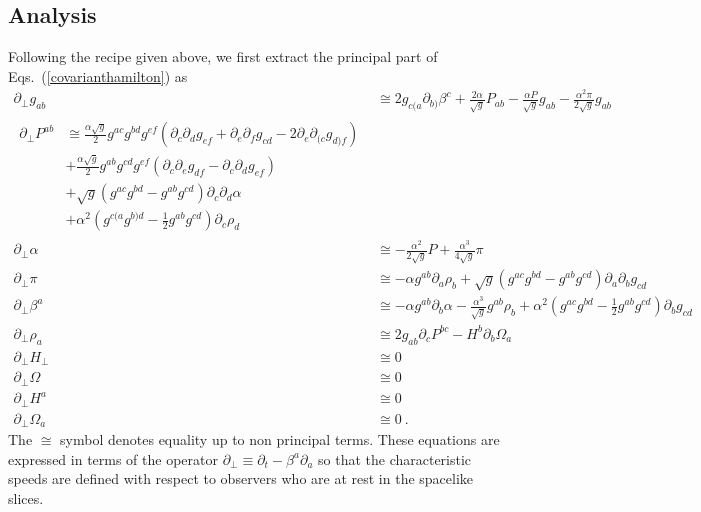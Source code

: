 \subsection{Analysis}\label{wellposednessanalysis}
Following the recipe given above, we first extract the principal part of Eqs.~(\ref{covarianthamilton}) as
\begin{subequations}\label{principalhamilton}
\begin{align}
\partial_{\perp}g_{ab} &\cong 2g_{c(a}\partial_{b)}\beta^{c} + \frac{2\alpha}{\sqrt{g}}P_{ab} - \frac{\alpha P}{\sqrt{g}}g_{ab} - \frac{\alpha^{2}\pi}{2\sqrt{g}}g_{ab}\\
\begin{split}
\partial_{\perp}P^{ab} &\cong \frac{\alpha\sqrt{g}}{2}g^{ac}g^{bd}g^{ef}\left(\partial_{c}\partial_{d}g_{ef} + \partial_{e}\partial_{f}g_{cd} - 2\partial_{e}\partial_{(c}g_{d)f}\right)\\
& + \frac{\alpha\sqrt{g}}{2}g^{ab}g^{cd}g^{ef}\left(\partial_{c}\partial_{e}g_{df} - \partial_{c}\partial_{d}g_{ef}\right)\\
& + \sqrt{g}\left(g^{ac}g^{bd} - g^{ab}g^{cd}\right)\partial_{c}\partial_{d}\alpha\\
& + \alpha^{2}\left(g^{c(a}g^{b)d} - \frac{1}{2}g^{ab}g^{cd}\right)\partial_{c}\rho_{d}
\end{split}\\
\partial_{\perp}\alpha & \cong -\frac{\alpha^{2}}{2\sqrt{g}}P + \frac{\alpha^{3}}{4\sqrt{g}}\pi\\
\partial_{\perp}\pi & \cong -\alpha g^{ab}\partial_{a}\rho_{b} + \sqrt{g}\left(g^{ac}g^{bd} - g^{ab}g^{cd}\right)\partial_{a}\partial_{b}g_{cd}\\
\partial_{\perp}\beta^{a} & \cong -\alpha g^{ab}\partial_{b}\alpha - \frac{\alpha^{3}}{\sqrt{g}}g^{ab}\rho_{b} + \alpha^{2}\left(g^{ac}g^{bd} - \frac{1}{2}g^{ab}g^{cd}\right)\partial_{b}g_{cd}\\
\partial_{\perp}\rho_{a} & \cong 2g_{ab}\partial_{c}P^{bc} - H^{b}\partial_{b}\Omega_{a}\\
\partial_{\perp}H_{\perp} & \cong 0\\
\partial_{\perp}\Omega & \cong 0\\
\partial_{\perp}H^{a} & \cong 0\\
\partial_{\perp}\Omega_{a} & \cong 0 \ .
\end{align}
\end{subequations}
The $\cong$ symbol denotes equality up to non principal terms. These equations are expressed in terms of the operator $\partial_{\perp} \equiv \partial_{t} - \beta^{a}\partial_{a}$ so that the characteristic speeds are defined with respect to observers who are at rest in the spacelike slices. 

